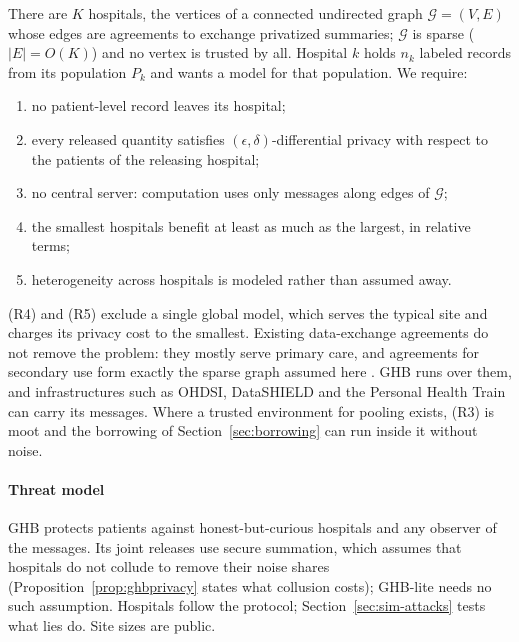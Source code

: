 \documentclass[acmsmall,screen,review]{acmart}
\theoremstyle{acmdefinition}
\begin{document}
There are $K$ hospitals, the vertices of a connected undirected graph $\mathcal{G}=(V,E)$ whose edges are agreements to exchange privatized summaries; $\mathcal{G}$ is sparse ($|E|=O(K)$) and no vertex is trusted by all. Hospital $k$ holds $n_k$ labeled records from its population $P_k$ and wants a model for that population. We require:
\begin{enumerate}[label=(R\arabic*),leftmargin=*,itemsep=1pt]
\item no patient-level record leaves its hospital;
\item every released quantity satisfies $(\epsilon,\delta)$-differential privacy with respect to the patients of the releasing hospital;
\item no central server: computation uses only messages along edges of $\mathcal{G}$;
\item the smallest hospitals benefit at least as much as the largest, in relative terms;
\item heterogeneity across hospitals is modeled rather than assumed away.
\end{enumerate}
(R4) and (R5) exclude a single global model, which serves the typical site and charges its privacy cost to the smallest. Existing data-exchange agreements do not remove the problem: they mostly serve primary care, and agreements for secondary use form exactly the sparse graph assumed here \cite{ehds2025,gdpr2016}. GHB runs over them, and infrastructures such as OHDSI, DataSHIELD and the Personal Health Train \cite{beyan2020distributed,gaye2014datashield,hripcsak2015observational} can carry its messages. Where a trusted environment for pooling exists, (R3) is moot and the borrowing of Section~\ref{sec:borrowing} can run inside it without noise.

\paragraph{Threat model} GHB protects patients against honest-but-curious hospitals and any observer of the messages. Its joint releases use secure summation, which assumes that hospitals do not collude to remove their noise shares (Proposition~\ref{prop:ghbprivacy} states what collusion costs); GHB-lite needs no such assumption. Hospitals follow the protocol; Section~\ref{sec:sim-attacks} tests what lies do. Site sizes are public.
\end{document}
